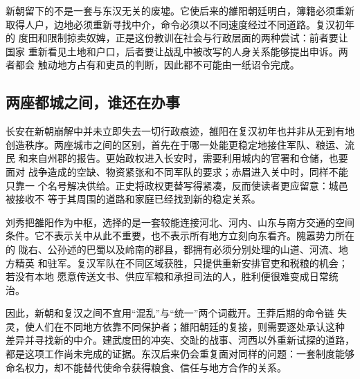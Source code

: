 新朝留下的不是一套与东汉无关的废墟。它使后来的雒阳朝廷明白，簿籍必须重新
取得人户，边地必须重新寻找中介，命令必须以不同速度经过不同道路。复汉初年的
度田和限制掠卖奴婢，正是这份教训在社会与行政层面的两种尝试：前者要让国家
重新看见土地和户口，后者要让战乱中被改写的人身关系能够提出申诉。两者都会
触动地方占有和吏员的判断，因此都不可能由一纸诏令完成。

\subsection{两座都城之间，谁还在办事}

长安在新朝崩解中并未立即失去一切行政痕迹，雒阳在复汉初年也并非从无到有地
创造秩序。两座城市之间的区别，首先在于哪一处能更稳定地接住军队、粮运、流民
和来自州郡的报告。更始政权进入长安时，需要利用城内的官署和仓储，也要面对
战争造成的空缺、物资紧张和不同军队的要求；赤眉进入关中时，同样不能只靠一
个名号解决供给。正史将政权更替写得紧凑，反而使读者更应留意：城邑被接收不
等于其周围的道路和家庭已经找到新的稳定关系。

刘秀把雒阳作为中枢，选择的是一套较能连接河北、河内、山东与南方交通的空间
条件。它不表示关中从此不重要，也不表示所有地方立刻向东看齐。隗嚣势力所在的
陇右、公孙述的巴蜀以及岭南的郡县，都拥有必须分别处理的山道、河流、地方精英
和驻军。复汉军队在不同区域获胜，只提供重新安排官吏和税粮的机会；若没有本地
愿意传送文书、供应军粮和承担司法的人，胜利便很难变成日常统治。

因此，新朝和复汉之间不宜用“混乱”与“统一”两个词截开。王莽后期的命令链
失灵，使人们在不同地方依靠不同保护者；雒阳朝廷的复接，则需要逐处承认这种
差异并寻找新的中介。建武度田的冲突、交趾的战事、河西以外重新试探的道路，
都是这项工作尚未完成的证据。东汉后来仍会重复面对同样的问题：一套制度能够
命名权力，却不能替代使命令获得粮食、信任与地方合作的关系。
